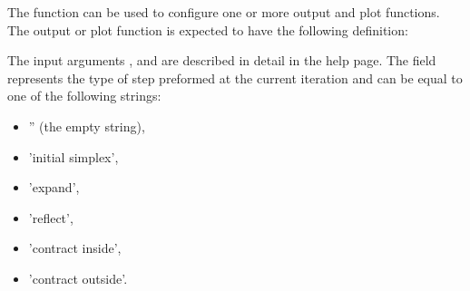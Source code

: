 \begin{Details}

The  function can be used to configure one or more output and
plot functions.
The output or plot function is expected to have the following definition:


The input arguments ,  and  are
described in detail in the  help page. The
 field represents the type of step preformed at
the current iteration and can be equal to one of the following strings:
\begin{itemize}

\item '' (the empty string),
\item 'initial simplex',
\item 'expand',
\item 'reflect',
\item 'contract inside',
\item 'contract outside'.

\end{itemize}

\end{Details}
%
